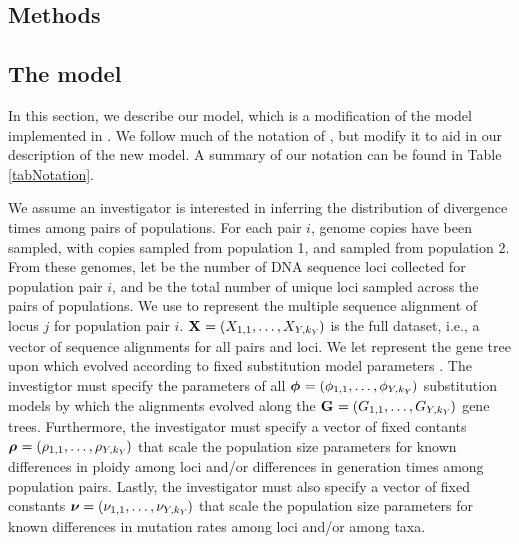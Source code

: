 \documentclass[letterpaper,12pt]{article}
\begin{document}
\begin{linenumbers}
\section*{Methods}

\subsection*{The model}
In this section, we describe our model, which is a modification
of the model implemented in \msb \citep{Huang2011,Oaks2012}.
We follow much of the notation of \citet{Oaks2012}, but modify it to
aid in our description of the new model.
A summary of our notation can be found in Table \ref{tabNotation}.

We assume an investigator is interested in inferring the distribution
of divergence times among \npairs{} pairs of populations.
For each pair $i$,  genome copies have been sampled, with
 copies sampled from population 1, and 
sampled from population 2.
From these genomes, let  be the number of DNA sequence loci collected
for population pair $i$, and \nlociTotal be the total number of unique loci
sampled across the \npairs{} pairs of populations.
We use  to represent the multiple sequence alignment of
locus $j$ for population pair $i$.
$\alignmentVector = (\alignment{1}{1}, \ldots,
    \alignment{\npairs{}}{\nloci{\npairs{}}})$
is the full dataset,
i.e., a vector of sequence alignments for all pairs and loci.
We let  represent the gene tree upon which 
evolved according to fixed \hky substitution model parameters .
The investigtor must specify the parameters of all
$\hkyModelVector = (\hkyModel{1}{1}, \ldots,
\hkyModel{\npairs{}}{\nloci{\npairs{}}})$
substitution models by which the alignments evolved along the
$\geneTreeVector = (\geneTree{1}{1}, \ldots,
\geneTree{\npairs{}}{\nloci{\npairs{}}})$
gene trees.
Furthermore, the investigator must specify a vector of fixed contants
$\ploidyScalarVector = (\ploidyScalar{1}{1}, \ldots,
\ploidyScalar{\npairs{}}{\nloci{\npairs{}}})$
that scale the population size parameters for known differences in ploidy among
loci and/or differences in generation times among population pairs.
Lastly, the investigator must also specify a vector of fixed constants
$\mutationRateScalarConstantVector = (\mutationRateScalarConstant{1}{1},
\ldots, \mutationRateScalarConstant{\npairs{}}{\nloci{\npairs{}}})$
that scale the population size parameters for known differences in
mutation rates among loci and/or among taxa.


\end{linenumbers}
\end{document}

